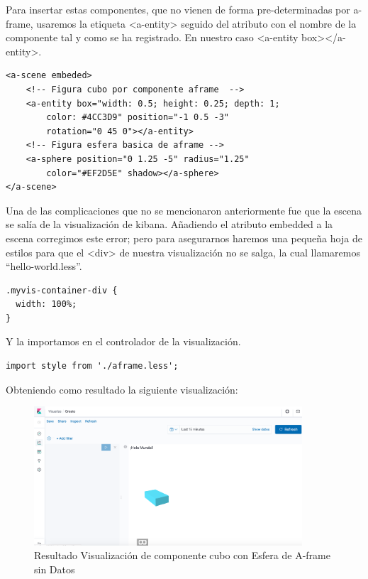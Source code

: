 \documentclass[a4paper, 12pt]{book}
\begin{document}
Para insertar estas componentes, que no vienen de forma pre-determinadas por a-frame, usaremos la etiqueta <a-entity> seguido del atributo con el nombre de la componente tal y como se ha registrado. En nuestro caso <a-entity box></a-entity>.

\begin{lstlisting}[frame=single]
<a-scene embeded>
    <!-- Figura cubo por componente aframe  -->
    <a-entity box="width: 0.5; height: 0.25; depth: 1; 
        color: #4CC3D9" position="-1 0.5 -3" 
        rotation="0 45 0"></a-entity>
    <!-- Figura esfera basica de aframe -->
    <a-sphere position="0 1.25 -5" radius="1.25" 
        color="#EF2D5E" shadow></a-sphere>
</a-scene>
\end{lstlisting}

Una de las complicaciones que no se mencionaron anteriormente fue que la escena se salía de la visualización de kibana. Añadiendo el atributo embedded a la escena corregimos este error; pero para asegurarnos haremos una pequeña hoja de estilos para que el <div> de nuestra visualización no se salga, la cual llamaremos “hello-world.less”.

\begin{lstlisting}[frame=single]
.myvis-container-div {
  width: 100%;
}
\end{lstlisting}

Y la importamos en el controlador de la visualización.

\begin{lstlisting}[frame=single]
import style from './aframe.less';
\end{lstlisting}

Obteniendo como resultado la siguiente visualización:

\begin{figure}[H]
  \centering
  \includegraphics[width=10cm, keepaspectratio]{img/development/resultado-componente-box.png}
  \caption{Resultado Visualización de componente cubo con Esfera de A-frame sin Datos}
  \label{fig:resultadocomponente}
\end{figure}
\end{document}
